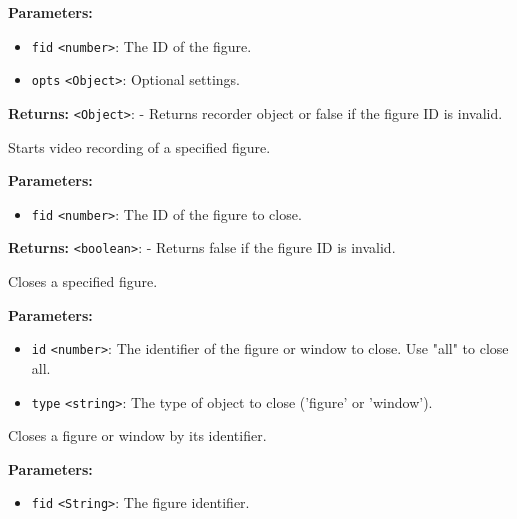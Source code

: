 \documentclass[12pt,a4paper]{article}
\begin{document}
\noindent \textbf{Parameters:}
\begin{itemize}
  \item \texttt{fid} \texttt{<number>}: The ID of the figure.
  \item \texttt{opts} \texttt{<Object>}: Optional settings.
\end{itemize}

\noindent \textbf{Returns:} \texttt{<Object>}: - Returns recorder object or false if the figure ID is invalid.

\noindent Starts video recording of a specified figure.

\vspace{5mm}
\noindent {}


\noindent \textbf{Parameters:}
\begin{itemize}
  \item \texttt{fid} \texttt{<number>}: The ID of the figure to close.
\end{itemize}

\noindent \textbf{Returns:} \texttt{<boolean>}: - Returns false if the figure ID is invalid.

\noindent Closes a specified figure.

\vspace{5mm}
\noindent {}


\noindent \textbf{Parameters:}
\begin{itemize}
  \item \texttt{id} \texttt{<number>}: The identifier of the figure or window to close. Use "all" to close all.
  \item \texttt{type} \texttt{<string>}: The type of object to close ('figure' or 'window').
\end{itemize}

\noindent Closes a figure or window by its identifier.

\vspace{5mm}
\noindent {}


\noindent \textbf{Parameters:}
\begin{itemize}
  \item \texttt{fid} \texttt{<String>}: The figure identifier.
\end{itemize}
\end{document}
